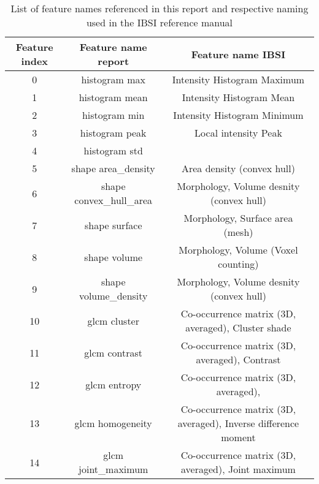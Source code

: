 \begin{table}
    \centering
    \caption{List of feature names referenced in this report and
     respective naming used in the IBSI reference manual}  
    \label{tab:feature_names} 
    \begin{tabular}{|c|c|c|}
        \hline
        Feature index & Feature name report & Feature name IBSI \\
        \hline
        0            & histogram max & Intensity Histogram Maximum \\
        \hline
        1           & histogram mean & Intensity Histogram Mean\\
        \hline
        2            & histogram min & Intensity Histogram Minimum\\
        \hline
        3           & histogram peak & Local intensity Peak\\
        \hline
        4            & histogram std &   \\  %
        \hline
        5       & shape area\_density & Area density (convex hull)\\
        \hline
        6   & shape convex\_hull\_area & Morphology, Volume desnity (convex hull)\\
        \hline
        7            & shape surface & Morphology, Surface area (mesh)\\
        \hline
        8             & shape volume & Morphology, Volume (Voxel counting)\\
        \hline
        9     & shape volume\_density & Morphology, Volume desnity (convex hull)\\
        \hline
        10            & glcm cluster & Co-occurrence matrix (3D, averaged), Cluster shade \\ %
        \hline
        11           & glcm contrast & Co-occurrence matrix (3D, averaged), Contrast\\
        \hline
        12            & glcm entropy & Co-occurrence matrix (3D, averaged),\\ %
        \hline
        13        & glcm homogeneity & Co-occurrence matrix (3D, averaged), Inverse difference moment\\
        \hline
        14      & glcm joint\_maximum & Co-occurrence matrix (3D, averaged), Joint maximum\\
        \hline
    \end{tabular} 
\end{table}

